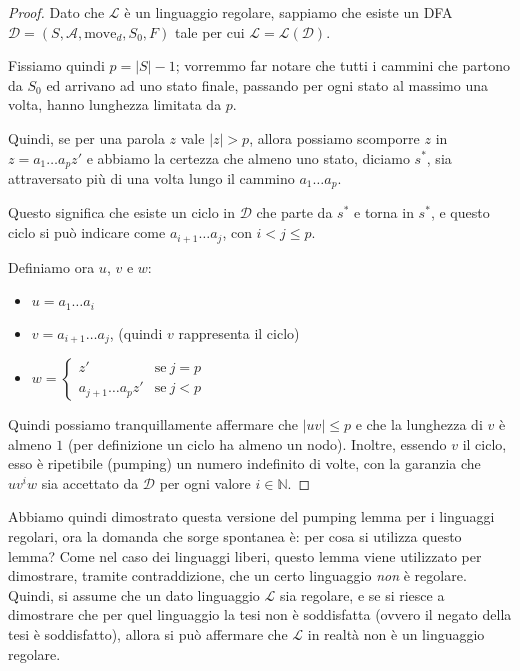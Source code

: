 \documentclass[class=book, crop=false, oneside, 12pt]{standalone}
\begin{document}
\begin{proof}
    Dato che \(\mathcal{L}\) è un linguaggio regolare, sappiamo che esiste un DFA \(\mathcal{D} = (S,\mathcal{A},\textrm{move}_d ,S_0, F)\) tale per cui \(\mathcal{L} = \mathcal{L}(\mathcal{D})\).

    Fissiamo quindi \(p=|S|-1\); vorremmo far notare che tutti i cammini che partono da \(S_0\) ed arrivano ad uno stato finale, passando per ogni stato al massimo una volta, hanno lunghezza limitata da \(p\).

    Quindi, se per una parola \(z\) vale \(|z|>p\), allora possiamo scomporre \(z\) in \(z = a_1 \dots a_p z'\) e abbiamo la certezza che almeno uno stato, diciamo \(s^\ast\), sia attraversato più di una volta lungo il cammino \(a_1 \dots a_p\).

    Questo significa che esiste un ciclo in \(\mathcal{D}\) che parte da \(s^\ast\) e torna in \(s^\ast\), e questo ciclo si può indicare come \(a_{i+1} \dots a_j\), con \(i<j\le p\).

    Definiamo ora \(u\), \(v\) e \(w\):
    \begin{itemize}
        \item \(u = a_1 \dots a_i\)
        \item \(v = a_{i+1} \dots a_j\),  (quindi \(v\) rappresenta il ciclo)
        \item \(w = 
        \begin{cases}
            z'                   & \textrm{se} \ j = p\\ 
            a_{j+1} \dots a_pz'  & \textrm{se} \ j < p
        \end{cases}\)
    \end{itemize}

    Quindi possiamo tranquillamente affermare che \(|uv| \le p\) e che la lunghezza di \(v\) è almeno \(1\) (per definizione un ciclo ha almeno un nodo). Inoltre, essendo \(v\) il ciclo, esso è ripetibile (pumping) un numero indefinito di volte, con la garanzia che \(uv^iw\) sia accettato da \(\mathcal{D}\) per ogni valore \(i \in \mathbb{N}\). 
\end{proof}
Abbiamo quindi dimostrato questa versione del pumping lemma per i linguaggi regolari, ora la domanda che sorge spontanea è: per cosa si utilizza questo lemma? Come nel caso dei linguaggi liberi, questo lemma viene utilizzato per dimostrare, tramite contraddizione, che un certo linguaggio \emph{non} è regolare. Quindi, si assume che un dato linguaggio \(\mathcal{L}\) sia regolare, e se si riesce a dimostrare che per quel linguaggio la tesi non è soddisfatta (ovvero il negato della tesi è soddisfatto), allora si può affermare che \(\mathcal{L}\) in realtà non è un linguaggio regolare.
\end{document}
